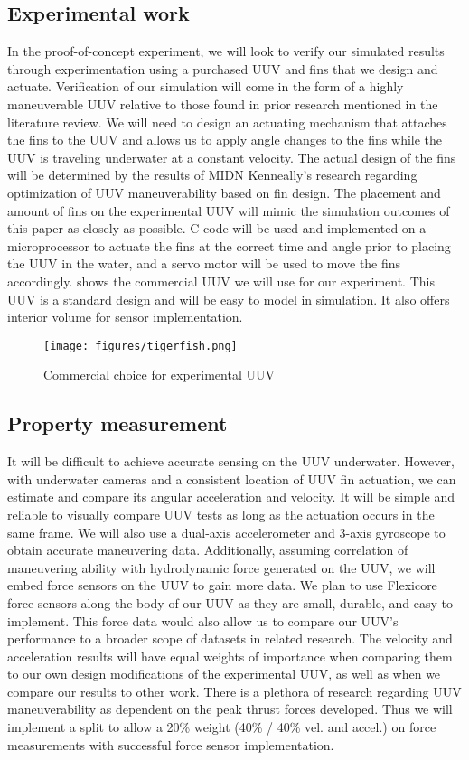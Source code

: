 \documentclass{IEEEtran}
\begin{document}
\subsection{Experimental work}
In the proof-of-concept experiment, we will look to verify our simulated results through experimentation using a purchased UUV and fins that we design and actuate. Verification of our simulation will come in the form of a highly maneuverable UUV relative to those found in prior research mentioned in the literature review. We will need to design an actuating mechanism that attaches the fins to the UUV and allows us to apply angle changes to the fins while the UUV is traveling underwater at a constant velocity. The actual design of the fins will be determined by the results of MIDN Kenneally’s research regarding optimization of UUV maneuverability based on fin design. The placement and amount of fins on the experimental UUV will mimic the simulation outcomes of this paper as closely as possible. C code will be used and implemented on a microprocessor to actuate the fins at the correct time and angle prior to placing the UUV in the water, and a servo motor will be used to move the fins accordingly.  shows the commercial UUV we will use for our experiment. This UUV is a standard design and will be easy to model in simulation. It also offers interior volume for sensor implementation.
\begin{figure*}
\begin{center}
\texttt{[image: figures/tigerfish.png]}
\end{center}
\caption{Commercial choice for experimental UUV}
\label{fig:UUV}
\end{figure*}

\subsection{Property measurement}
It will be difficult to achieve accurate sensing on the UUV underwater. However, with underwater cameras and a consistent location of UUV fin actuation, we can estimate and compare its angular acceleration and velocity. It will be simple and reliable to visually compare UUV tests as long as the actuation occurs in the same frame. We will also use a dual-axis accelerometer and 3-axis gyroscope to obtain accurate maneuvering data. Additionally, assuming correlation of maneuvering ability with hydrodynamic force generated on the UUV, we will embed force sensors on the UUV to gain more data. We plan to use Flexicore force sensors along the body of our UUV as they are small, durable, and easy to implement. This force data would also allow us to compare our UUV’s performance to a broader scope of datasets in related research. The velocity and acceleration results will have equal weights of importance when comparing them to our own design modifications of the experimental UUV, as well as when we compare our results to other work. There is a plethora of research regarding UUV maneuverability as dependent on the peak thrust forces developed. Thus we will implement a split to allow a 20\% weight (40\% / 40\% vel. and accel.) on force measurements with successful force sensor implementation.
\end{document}
